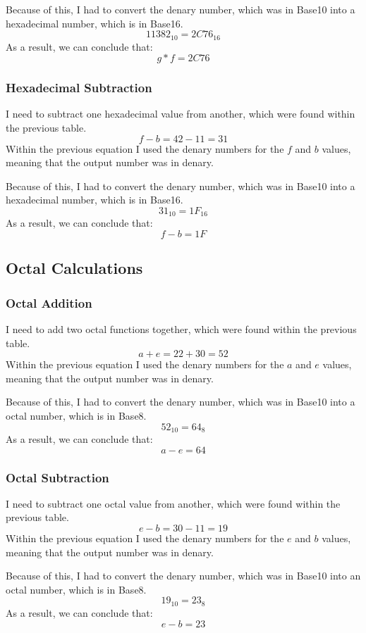 \documentclass[a4paper,12pt]{article}
\begin{document}
Because of this, I had to convert the denary number, which was in Base10 into a hexadecimal number, which is in Base16.
\[
  11382_{10} = 2C76_{16}
\]
As a result, we can conclude that:
\[
  g * f = 2C76
\]

\newpage

\subsubsection{Hexadecimal Subtraction}
I need to subtract one hexadecimal value from another, which were found within the previous table.
\[
  f - b = 42 - 11 = 31
\]
Within the previous equation I used the denary numbers for the $f$ and $b$ values, meaning that the output number was in denary.

Because of this, I had to convert the denary number, which was in Base10 into a hexadecimal number, which is in Base16.
\[
  31_{10} = 1F_{16}
\]
As a result, we can conclude that:
\[
  f - b = 1F
\]

\newpage

\subsection{Octal Calculations}
  \subsubsection{Octal Addition}
    I need to add two octal functions together, which were found within the previous table.
    \[
      a + e = 22 + 30 = 52
    \]
    Within the previous equation I used the denary numbers for the $a$ and $e$ values, meaning that the output number was in denary.

    Because of this, I had to convert the denary number, which was in Base10 into a octal number, which is in Base8.
    \[
      52_{10} = 64_{8}
    \]
    As a result, we can conclude that:
    \[
      a - e = 64
    \]

  \subsubsection{Octal Subtraction}
    I need to subtract one octal value from another, which were found within the previous table.
    \[
      e - b = 30 - 11 = 19
    \]
    Within the previous equation I used the denary numbers for the $e$ and $b$ values, meaning that the output number was in denary.

    Because of this, I had to convert the denary number, which was in Base10 into an octal number, which is in Base8.
    \[
      19_{10} = 23_{8}
    \]
    As a result, we can conclude that:
    \[
      e - b = 23
    \]
\end{document}
